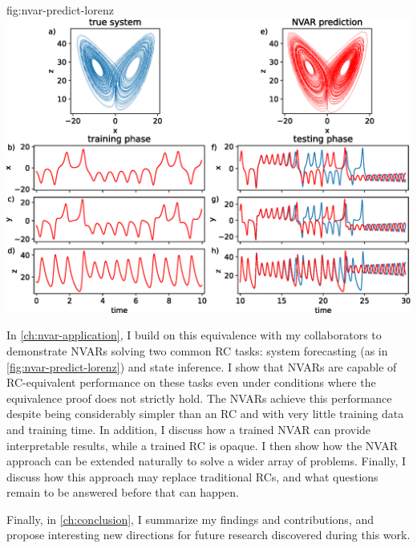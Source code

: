 \begin{reusefigure}{fig:nvar-predict-lorenz}
  \includegraphics[width=\textwidth]{figures/nvar-predict-lorenz}
  \caption{The true Lorenz attractor (a) and NVAR predicted attractor
    (e) for a single training trial. (b) -- (d) True Lorenz system
    (blue) during training overlaid with NVAR output (red) calculated
    after training is complete. (f) -- (h) True (blue) and NVAR
    forecasted output (red). The NVAR shows good agreement with the
    true system as far as $5$ Lyapunov periods in to the autonomous
    forecast.}
\end{reusefigure}

In \cref{ch:nvar-application}, I build on this equivalence with my
collaborators to demonstrate NVARs solving two common RC tasks: system
forecasting (as in \cref{fig:nvar-predict-lorenz}) and state
inference.  I show that NVARs are capable of RC-equivalent performance
on these tasks even under conditions where the equivalence proof does
not strictly hold. The NVARs achieve this performance despite being
considerably simpler than an RC and with very little training data and
training time. In addition, I discuss how a trained NVAR can provide
interpretable results, while a trained RC is opaque. I then show how
the NVAR approach can be extended naturally to solve a wider array of
problems. Finally, I discuss how this approach may replace traditional
RCs, and what questions remain to be answered before that can happen.

Finally, in \cref{ch:conclusion}, I summarize my findings and
contributions, and propose interesting new directions for future
research discovered during this work.
